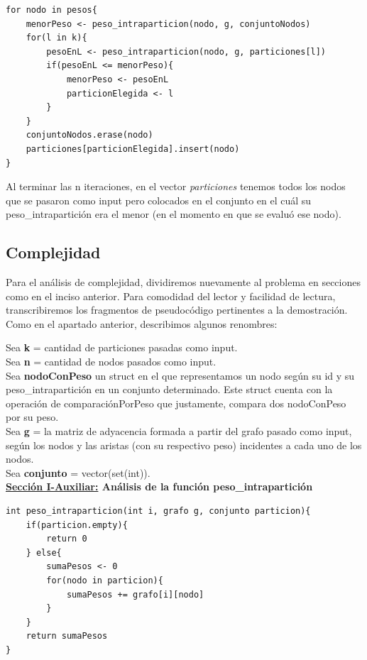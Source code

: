 \documentclass[10pt,a4paper]{article}
\begin{document}
\begin{lstlisting}[mathescape]
for nodo in pesos{
	menorPeso <- peso_intraparticion(nodo, g, conjuntoNodos)
	for(l in k){
		pesoEnL <- peso_intraparticion(nodo, g, particiones[l])
		if(pesoEnL <= menorPeso){
			menorPeso <- pesoEnL
			particionElegida <- l
		}
	}
	conjuntoNodos.erase(nodo)
	particiones[particionElegida].insert(nodo)
}
\end{lstlisting}


Al terminar las n iteraciones, en el vector \textit{particiones} tenemos todos los nodos que se pasaron como input pero colocados en el conjunto en el cuál su peso\_intrapartición era el menor (en el momento en que se evaluó ese nodo).


\newpage
\subsection{Complejidad}

Para el análisis de complejidad, dividiremos nuevamente al problema en secciones como en el inciso anterior. Para comodidad del lector y facilidad de lectura, transcribiremos los fragmentos de pseudocódigo pertinentes a la demostración.
Como en el apartado anterior, describimos algunos renombres:

\noindent Sea \textbf{k} = cantidad de particiones pasadas como input.\\
Sea \textbf{n} = cantidad de nodos pasados como input.\\
Sea \textbf{nodoConPeso} un struct en el que representamos un nodo según su id y su peso\_intrapartición en un conjunto determinado. Este struct cuenta con la operación de comparaciónPorPeso que justamente, compara dos nodoConPeso por su peso.\\
Sea \textbf{g} = la matriz de adyacencia formada a partir del grafo pasado como input, según los nodos y las aristas (con su respectivo peso) incidentes a cada uno de los nodos.\\
Sea \textbf{conjunto} = vector(set(int)).\\


\textbf{\underline{Sección I-Auxiliar:} Análisis de la función peso\_intrapartición}

\begin{lstlisting}
int peso_intraparticion(int i, grafo g, conjunto particion){
	if(particion.empty){
		return 0
	} else{
		sumaPesos <- 0
		for(nodo in particion){
			sumaPesos += grafo[i][nodo]
		}
	}
	return sumaPesos
}
\end{lstlisting}
\end{document}
